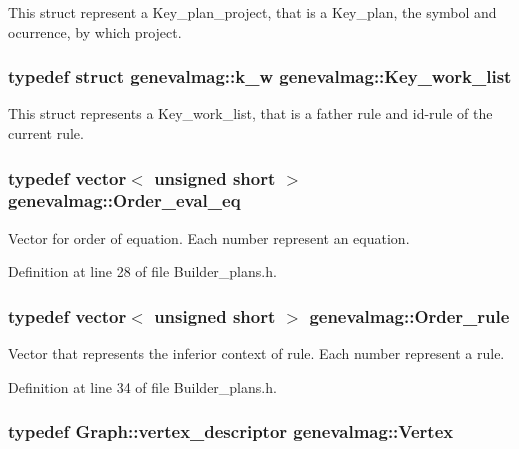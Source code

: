 This struct represent a Key\_\-plan\_\-project, that is a Key\_\-plan, the symbol and ocurrence, by which project. \hypertarget{namespacegenevalmag_457ae083d404303792f6086cf82a1c59}{
\subsubsection[{Key\_\-work\_\-list}]{\setlength{\rightskip}{0pt plus 5cm}typedef struct {\bf genevalmag::k\_\-w}  {\bf genevalmag::Key\_\-work\_\-list}}}
\label{namespacegenevalmag_457ae083d404303792f6086cf82a1c59}


This struct represents a Key\_\-work\_\-list, that is a father rule and id-rule of the current rule. \hypertarget{namespacegenevalmag_0bb2e8b0fa1b07b873f0363719de7b64}{
\subsubsection[{Order\_\-eval\_\-eq}]{\setlength{\rightskip}{0pt plus 5cm}typedef vector$<$ unsigned short $>$ {\bf genevalmag::Order\_\-eval\_\-eq}}}
\label{namespacegenevalmag_0bb2e8b0fa1b07b873f0363719de7b64}


Vector for order of equation. Each number represent an equation. 

Definition at line 28 of file Builder\_\-plans.h.\hypertarget{namespacegenevalmag_ed20da32fb9692645ae53d911d274fd5}{
\subsubsection[{Order\_\-rule}]{\setlength{\rightskip}{0pt plus 5cm}typedef vector$<$ unsigned short $>$ {\bf genevalmag::Order\_\-rule}}}
\label{namespacegenevalmag_ed20da32fb9692645ae53d911d274fd5}


Vector that represents the inferior context of rule. Each number represent a rule. 

Definition at line 34 of file Builder\_\-plans.h.\hypertarget{namespacegenevalmag_2aae7b018fc2a9afae131bbf639181b5}{
\subsubsection[{Vertex}]{\setlength{\rightskip}{0pt plus 5cm}typedef Graph::vertex\_\-descriptor {\bf genevalmag::Vertex}}}
\label{namespacegenevalmag_2aae7b018fc2a9afae131bbf639181b5}




